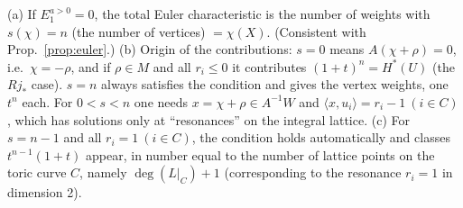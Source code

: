 \begin{cor}\tP
(a) If $E_1^{a>0}=0$, the total Euler characteristic is the number of weights with $s(\chi)=n$ (the number of vertices) $=\chi(X)$. (Consistent with Prop.~\ref{prop:euler}.) (b) Origin of the contributions: $s=0$ means $A(\chi+\rho)=0$, i.e.\ $\chi=-\rho$, and if $\rho\in M$ and all $r_i\le0$ it contributes $(1+t)^n=H^*(U)$ (the $Rj_*$ case). $s=n$ always satisfies the condition and gives the vertex weights, one $t^n$ each. For $0<s<n$ one needs $x=\chi+\rho\in A^{-1}W$ and $\langle x,u_i\rangle=r_i-1\ (i\in C)$, which has solutions only at ``resonances'' on the integral lattice. (c) For $s=n-1$ and all $r_i=1\ (i\in C)$, the condition holds automatically and classes $t^{n-1}(1+t)$ appear, in number equal to the number of lattice points on the toric curve $C$, namely $\deg(L|_C)+1$ (corresponding to the resonance $r_i=1$ in dimension 2).
\end{cor}

